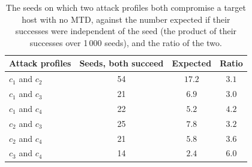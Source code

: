
\begin{table}[htbp]
\centering
\caption[Seeds on which two attack profiles both succeed]{The seeds on which two attack profiles both compromise a target host with no MTD, against the number expected if their successes were independent of the seed (the product of their successes over 1\,000 seeds), and the ratio of the two.}
\label{tab:fa-success-pairs}
\tablestyle
\begin{tabular}{@{}l *{3}{c}@{}}
\toprule
Attack profiles & Seeds, both succeed & Expected & Ratio \\
\midrule
$c_1$ and $c_2$ & 54 & $17.2$ & $3.1$ \\
$c_1$ and $c_3$ & 21 & $6.9$ & $3.0$ \\
$c_1$ and $c_4$ & 22 & $5.2$ & $4.2$ \\
$c_2$ and $c_3$ & 25 & $7.8$ & $3.2$ \\
$c_2$ and $c_4$ & 21 & $5.8$ & $3.6$ \\
$c_3$ and $c_4$ & 14 & $2.4$ & $6.0$ \\
\bottomrule
\end{tabular}
\end{table}
